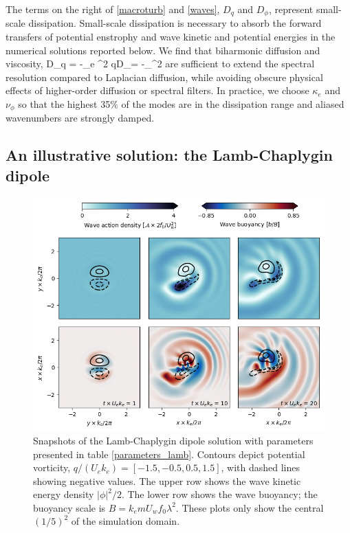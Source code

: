 \documentclass{jfm}
\begin{document}
The terms on the right of
\eqref{macroturb}  and \eqref{waves}, $D_q$ and $D_\phi$, represent small-scale
dissipation.  Small-scale dissipation is necessary to absorb the forward transfers
of potential enstrophy and wave kinetic and potential energies in the numerical
solutions reported below. We find that biharmonic diffusion and viscosity,
\beq\label{biharm}
D_q = -\kappa_e \lap^2 q\qquad{}\qquad D_\phi = -\nu_\phi \lap^2 \phi\com
\eeq
are sufficient to extend the spectral resolution compared to Laplacian diffusion,
while avoiding obscure physical effects of higher-order diffusion or spectral
filters. In practice, we choose $\kappa_e$ and $\nu_\phi$ so that  the highest 35$\%$
of the  modes are  in the dissipation range and aliased wavenumbers are strongly
damped.



\subsection{An illustrative solution: the Lamb-Chaplygin dipole}

\begin{figure}
\label{snaps_lamb}
\centering
\includegraphics[width=.925\textwidth]{figs/fig1.png}
\caption{Snapshots of the Lamb-Chaplygin dipole solution with parameters presented
          in table \ref{parameters_lamb}.
        Contours depict potential vorticity, $q / (U_e k_e) = [
        -1.5,-0.5,0.5,1.5]$, with dashed lines showing negative values. The upper row shows the wave kinetic energy density $|\phi|^2/2$. The lower row shows the wave buoyancy;
        the buoyancy scale is $B = k_e m U_w f_0 \lambda^2$.
        These plots only show the central $(1/5)^2$
        of the simulation domain.}
\end{figure}
\end{document}
